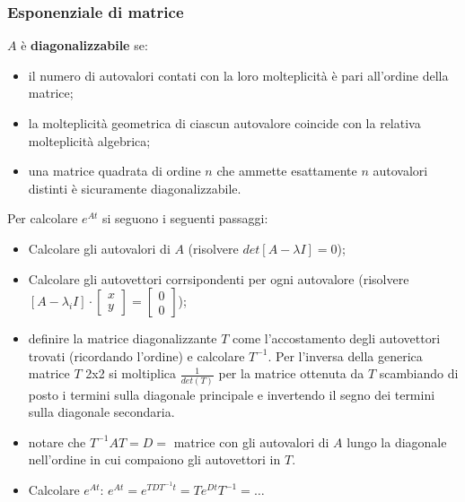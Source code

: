 \begin{landscape}
\begin{multicols*}{3}
    \subsubsection*{Esponenziale di matrice}
    $A$ è \textbf{diagonalizzabile} se:
    \begin{itemize}
        \item il numero di autovalori contati con la loro molteplicità è pari all’ordine della matrice;
        \item la molteplicità geometrica di ciascun autovalore coincide con la relativa molteplicità algebrica;
        \item una matrice quadrata di ordine $n$ che ammette esattamente $n$ autovalori distinti è sicuramente diagonalizzabile.
    \end{itemize}
    Per calcolare $e^{At}$ si seguono i seguenti passaggi:
    \begin{itemize}
        \item Calcolare gli autovalori di $A$ (risolvere $det[A-\lambda I] = 0$);
        \item Calcolare gli autovettori corrsipondenti per ogni autovalore \newline (risolvere $[A-\lambda_i I] \cdot \left[\begin{matrix}
            x\\y
        \end{matrix}\right] = \left[\begin{matrix}
            0\\0
        \end{matrix}\right]$);
        \item definire la matrice diagonalizzante $T$ come l'accostamento degli autovettori trovati (ricordando l'ordine) e calcolare $T^{-1}$. Per l’inversa della generica matrice $T$ 2x2 si moltiplica $\frac{1}{det(T)}$ per la matrice ottenuta da $T$ scambiando di posto i termini sulla diagonale principale e invertendo
        il segno dei termini sulla diagonale secondaria.
        \item notare che $T^{-1} A T = D = $ matrice con gli autovalori di $A$ lungo la diagonale nell'ordine in cui compaiono gli autovettori in $T$.
        \item Calcolare $e^{At}$:\newline
        $e^{At} = e^{TDT^{-1} t} = T e^{Dt} T^{-1} = \dots$
    \end{itemize}

\end{multicols*}
\end{landscape}
